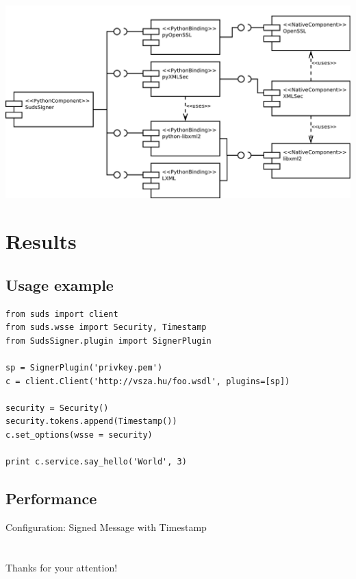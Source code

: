 \documentclass{beamer}
\begin{document}
\begin{frame}
\begin{center}
 \includegraphics[width=\textwidth]{images/cmpdSudsSigner.pdf}
\end{center}
\end{frame}

\section{Results}

\subsection{Usage example}

\begin{frame}[fragile]
\begin{lstlisting}
from suds import client
from suds.wsse import Security, Timestamp
from SudsSigner.plugin import SignerPlugin

sp = SignerPlugin('privkey.pem')
c = client.Client('http://vsza.hu/foo.wsdl', plugins=[sp])

security = Security()
security.tokens.append(Timestamp())
c.set_options(wsse = security)

print c.service.say_hello('World', 3)
\end{lstlisting}
\end{frame}

\subsection{Performance}

\begin{frame}
\begin{center}
Configuration: Signed Message with Timestamp
\end{center}
\begin{table}[htbp]
 \begin{center}
  
 \end{center}
\end{table}
\end{frame}

\section{}

\begin{frame}
\begin{center}
\begin{LARGE}
Thanks for your attention!
\end{LARGE}
\end{center}
\end{frame}
\end{document}
